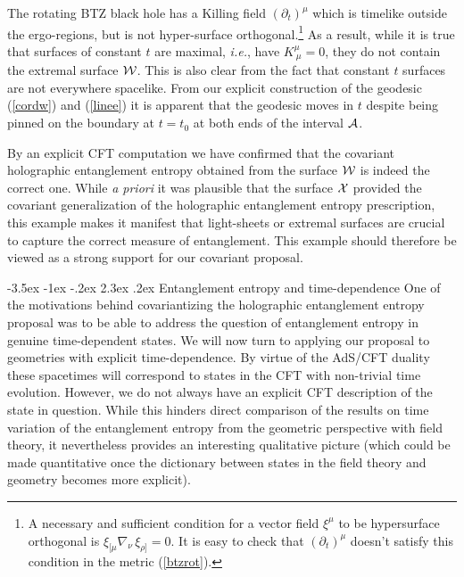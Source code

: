 \documentclass[12pt]{article}
\makeatletter
\renewcommand\section{\@startsection {section}{1}{\z@}%
                                   {-3.5ex \@plus -1ex \@minus -.2ex}%
                                   {2.3ex \@plus.2ex}%
                                   {\normalfont\large\bfseries}}
\def\req#1{(\ref{#1})}
\def\({\left (}
\def\){\right )}
\def\ie{{\it i.e.}}
\def\p{\partial}
\def\CA{{\cal A}}
\def\CW{{\cal W}}
\def\CX{{\cal X}}
\def\p{\partial}
\def\p{\partial}
\def\Gms{\CW}
\def\Xms{\CX}
\def\rA{\CA}
\makeatother
\begin{document}
The rotating BTZ black hole has a Killing field $(\p_t)^\mu$ which is timelike outside the ergo-regions, but is not hyper-surface orthogonal.\footnote{A necessary and sufficient condition for  a vector field $\xi^\mu$ to be hypersurface orthogonal is $\xi_{[\mu}\nabla_{\!\nu}\,\xi_{\rho]} =0$. It is easy to check that $\(\p_t\)^\mu$ doesn't satisfy this condition in the metric \req{btzrot}.} As a result, while it is true that surfaces of constant $t$ are maximal, \ie, have $K^{\mu}_{\ \mu}= 0$, they do not contain the extremal surface $\Gms$. This is also clear from the fact that constant $t$ surfaces are not everywhere spacelike. From our explicit construction of the geodesic \req{cordw} and \req{linee} it is apparent that the geodesic moves in $t$ despite being pinned on the boundary at $t =t_0$ at both ends of the interval $\rA$.

By an explicit CFT computation we have confirmed that the covariant holographic entanglement entropy obtained from the surface $\Gms$ is indeed the correct one.
While {\it a priori} it was plausible that the surface $\Xms$ provided the covariant
generalization of the holographic entanglement entropy prescription, this example makes it manifest that light-sheets or extremal surfaces are crucial to capture the correct measure of entanglement. This example should therefore be viewed as a strong support for our covariant proposal.

\section{Entanglement entropy and time-dependence}
\label{timedep}
One of the motivations behind covariantizing the holographic
entanglement entropy proposal was to be able to address the question
of entanglement entropy in genuine time-dependent states. We will
now turn to applying our proposal to geometries with explicit
time-dependence. By virtue of the AdS/CFT duality these spacetimes
will correspond to states in the CFT with non-trivial time
evolution.  However, we do not always have an explicit CFT
description of the state in question. While this hinders direct
comparison of the results on time variation of the entanglement
entropy from the geometric perspective with field theory, it
nevertheless provides an interesting qualitative picture (which
could be made quantitative once the dictionary between states in the
field theory and geometry becomes more explicit).
\end{document}
